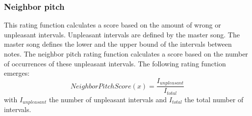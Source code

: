 \subsubsection{Neighbor pitch}\label{sec:rater:neighbourpitch}
This rating function calculates a score based on the amount of wrong or unpleasant intervals. Unpleasant intervals are defined by the master song. The master song defines the lower and the upper bound of the intervals between notes. The neighbor pitch rating function calculates a score based on the number of occurrences of these unpleasant intervals. The following rating function emerges:
\[ NeighborPitchScore(x) = \frac{I_{unpleasant}}{I_{total}} \]
with $I_{unpleasant}$ the number of unpleasant intervals and $I_{total}$ the total number of intervals.